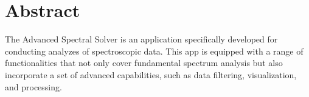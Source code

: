 \chapter*{Abstract}
\label{cha:Abstract}
The Advanced Spectral Solver is an application specifically developed for conducting analyzes of spectroscopic data. This app is equipped with a range of functionalities that not only cover fundamental spectrum analysis but also incorporate a set of advanced capabilities, such as data filtering, visualization, and processing. 
